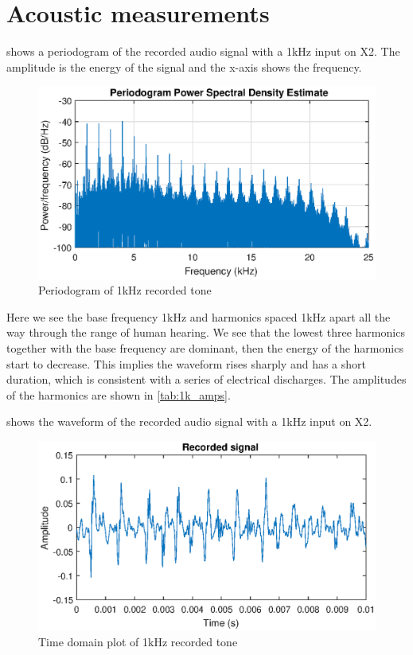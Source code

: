 \chapter{Acoustic measurements}

 shows a periodogram of the recorded audio signal with a 1kHz input on X2. The amplitude is the energy of the signal and the x-axis shows the frequency.
\begin{figure}[H]
    \centering
    \includegraphics[trim={0cm 1.6cm 0cm 2cm},clip,width=\textwidth]{img/Periodogram_1khz-09.eps}
    \caption{Periodogram of 1kHz recorded tone}
    \label{fig:period_1k}
\end{figure}

Here we see the base frequency 1kHz and harmonics spaced 1kHz apart all the way through the range of human hearing. We see that the lowest three harmonics together with the base frequency are dominant, then the energy of the harmonics start to decrease. This implies the waveform rises sharply and has a short duration, which is consistent with a series of electrical discharges. The amplitudes of the harmonics are shown in \cref{tab:1k_amps}.

 shows the waveform of the recorded audio signal with a 1kHz input on X2.

\begin{figure}[H]
    \centering
    \includegraphics[trim={0cm 1.6cm 0cm 2cm},clip,width=\textwidth]{img/Recorded_1khz-09.eps}
    \caption{Time domain plot of 1kHz recorded tone}
    \label{fig:recorded_1k}
\end{figure}